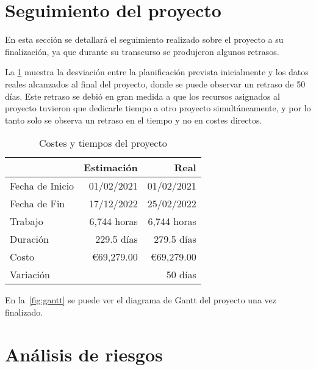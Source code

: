 \section{Seguimiento del proyecto}
\label{sec:manager:monitoring}

En esta sección se detallará el seguimiento realizado sobre el proyecto a su finalización, ya que durante su transcurso se produjeron algunos retrasos.

La \cref{tab:monitoring} muestra la desviación entre la planificación prevista inicialmente y los datos reales alcanzados al final del proyecto, donde se puede observar un retraso de 50 días. Este retraso se debió en gran medida a que los recursos asignados al proyecto tuvieron que dedicarle tiempo a otro proyecto simultáneamente, y por lo tanto solo se observa un retraso en el tiempo y no en costes directos.

\begin{table}[htbp!]
    \centering
    \begin{tabular}{l r r}
        \toprule
                        & \textbf{Estimación} & \textbf{Real}    \\
        \midrule \midrule
        Fecha de Inicio & 01/02/2021          & 01/02/2021       \\ \midrule
        Fecha de Fin    & 17/12/2022          & 25/02/2022       \\ \midrule
        Trabajo         & 6,744 horas         & 6,744 horas    \\ \midrule
        Duración        & 229.5 días          & 279.5 días  \\  \midrule
        Costo           & \euro{69,279.00}    & \euro{69,279.00} \\ \midrule
        Variación       &                     & 50 días          \\
        \bottomrule
    \end{tabular}
    \caption{Costes y tiempos del proyecto}
    \label{tab:monitoring}
\end{table}


En la~\cref{fig:gantt} se puede ver el diagrama de Gantt del proyecto una vez finalizado.




\section{Análisis de riesgos}
\label{sec:manager:risks}

